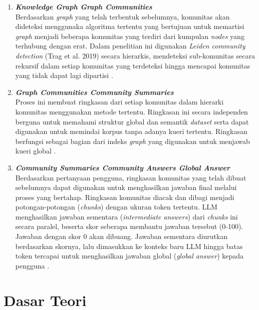 \begin{enumerate}
	\item \textbf{\textit{Knowledge Graph \textrightarrow{} Graph Communities}} \\
	      Berdasarkan \textit{graph} yang telah terbentuk sebelumnya, komunitas akan dideteksi menggunaka algoritma tertentu yang bertujuan untuk memartisi \textit{graph} menjadi beberapa komunitas yang terdiri dari kumpulan \textit{nodes} yang terhubung dengan erat.
	      Dalam penelitian ini digunakan \textit{Leiden community detection} (Trag et al. 2019) secara hierarkis, mendeteksi sub-komunitas secara rekursif dalam setiap komunitas yang terdeteksi hingga mencapai komunitas yang tidak dapat lagi dipartisi \cite{Traag2019Leiden}.

	\item \textbf{\textit{Graph Communities \textrightarrow{} Community Summaries}} \\
	      Proses ini membuat ringkasan dari setiap komunitas dalam hierarki komunitas menggunakan metode tertentu.
	      Ringkasan ini secara independen berguna untuk memahami struktur global dan semantik \textit{dataset} serta dapat digunakan untuk memindai korpus tanpa adanya kueri tertentu.
	      Ringkasan berfungsi sebagai bagian dari indeks \textit{graph} yang digunakan untuk menjawab kueri global \cite{Edge2025LocalGlobalGraphRAG}.

	\item \textbf{\textit{Community Summaries \textrightarrow{} Community Answers \textrightarrow{} Global Answer}} \\
	      Berdasarkan pertanyaan pengguna, ringkasan komunitas yang telah dibuat sebelumnya dapat digunakan untuk menghasilkan jawaban final melalui proses yang bertahap.
	      Ringkasan komunitas diacak dan dibagi menjadi potongan-potongan (\textit{chunks}) dengan ukuran token tertentu.
	      LLM menghasilkan jawaban sementara (\textit{intermediate answers}) dari \textit{chunks} ini secara paralel, beserta skor seberapa membantu jawaban tersebut (0-100).
	      Jawaban dengan skor 0 akan dibuang.
	      Jawaban sementara diurutkan berdasarkan skornya, lalu dimasukkan ke konteks baru LLM hingga batas token tercapai untuk menghasilkan jawaban global (\textit{global answer}) kepada pengguna \cite{Edge2025LocalGlobalGraphRAG}.
\end{enumerate}






\section{Dasar Teori}
